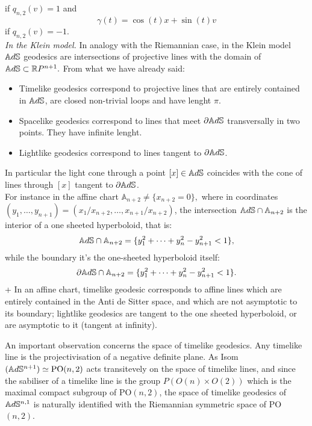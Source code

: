 if $q_{n,2}(v)=1$ and 
\[
    \gamma(t)=\cos(t)x+\sin(t)v
\]
if $q_{n,2}(v)=-1$.\\

\textit{In the Klein model.} In analogy with the Riemannian case, in the Klein model $\mathbb{A}d\mathbb{S}$ geodesics are intersections of projective lines with the domain of $\mathbb{A}d\mathbb{S}\subset\mathbb{R} P^{n+1}.$ From what we have already said: 
\begin{itemize}
    \item Timelike geodesics correspond to projective lines that are entirely contained in $\mathbb{A}d\mathbb{S}$, are closed non-trivial loops and have lenght $\pi.$ 
    \item Spacelike geodesics correspond to lines that meet $\partial \mathbb{A}d\mathbb{S}$ transversally in two points. They have infinite lenght.
    \item Lightlike geodesics correspond to lines tangent to $\partial\mathbb{A}d\mathbb{S}$.   
\end{itemize}

In particular the light cone through a point $[x]\in \mathbb{A}d\mathbb{S}$ coincides with the cone of lines through $[x]$ tangent to $\partial \mathbb{A}d\mathbb{S}$.\\ For instance in the affine chart $\mathbb{A}_{n+2}\neq\{x_{n+2}=0\},$ where in coordinates $(y_1, \dots, y_{n+1})=(x_1/x_{n+2},\dots, x_{n+1}/x_{n+2})$, the intersection $\mathbb{A}d\mathbb{S}\cap\mathbb{A}_{n+2}$ is the interior of a one sheeted hyperboloid, that is: 
\[
    \mathbb{A}d\mathbb{S}\cap\mathbb{A}_{n+2}=\{y_1^2+\dots+y_n^2-y_{n+1}^2<1\},
\]
 while the boundary it's the one-sheeted hyperboloid itself: 
 \[
    \partial\mathbb{A}d\mathbb{S}\cap\mathbb{A}_{n+2}=\{y_1^2+\dots+y_n^2-y_{n+1}^2<1\}.
\]+
In an affine chart, timelike geodesic corresponds to affine lines which are entirely contained in the Anti de Sitter space, and which are not asymptotic to its boundary; lightlike geodesics are tangent to the one sheeted hyperboloid, or are asymptotic to it (tangent at infinity).

\begin{observation} An important observation concerns the space of timelike geodesics. Any timelike line is the projectivisation of a negative definite plane. As Isom$(\mathbb{A}d\mathbb{S}^{n+1})\simeq \text{PO}(n,2)$ acts transitevely on the space of timelike lines, and since the sabiliser of a timelike line is the group $P(O(n)\times O(2))$ which is the maximal compact subgroup of $\text{PO}(n,2)$, the space of timelike geodesics of $\mathbb{A}d\mathbb{S}^{n,1}$ is naturally identified with the Riemannian symmetric space of PO$(n,2)$.
\end{observation}

